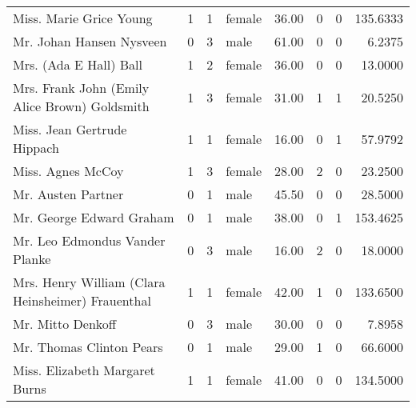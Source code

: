 \begin{tabular}{lrrlrrrr}
Miss. Marie Grice Young                            &         1 &       1 &  female &  36.00 &                        0 &                        0 &  135.6333 \\
Mr. Johan Hansen Nysveen                           &         0 &       3 &    male &  61.00 &                        0 &                        0 &    6.2375 \\
Mrs. (Ada E Hall) Ball                             &         1 &       2 &  female &  36.00 &                        0 &                        0 &   13.0000 \\
Mrs. Frank John (Emily Alice Brown) Goldsmith      &         1 &       3 &  female &  31.00 &                        1 &                        1 &   20.5250 \\
Miss. Jean Gertrude Hippach                        &         1 &       1 &  female &  16.00 &                        0 &                        1 &   57.9792 \\
Miss. Agnes McCoy                                  &         1 &       3 &  female &  28.00 &                        2 &                        0 &   23.2500 \\
Mr. Austen Partner                                 &         0 &       1 &    male &  45.50 &                        0 &                        0 &   28.5000 \\
Mr. George Edward Graham                           &         0 &       1 &    male &  38.00 &                        0 &                        1 &  153.4625 \\
Mr. Leo Edmondus Vander Planke                     &         0 &       3 &    male &  16.00 &                        2 &                        0 &   18.0000 \\
Mrs. Henry William (Clara Heinsheimer) Frauenthal  &         1 &       1 &  female &  42.00 &                        1 &                        0 &  133.6500 \\
Mr. Mitto Denkoff                                  &         0 &       3 &    male &  30.00 &                        0 &                        0 &    7.8958 \\
Mr. Thomas Clinton Pears                           &         0 &       1 &    male &  29.00 &                        1 &                        0 &   66.6000 \\
Miss. Elizabeth Margaret Burns                     &         1 &       1 &  female &  41.00 &                        0 &                        0 &  134.5000 \\

\end{tabular}
